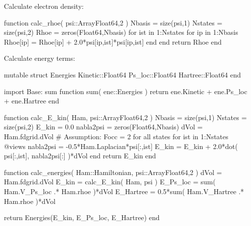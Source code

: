 Calculate electron density:
\begin{juliacode}
function calc_rhoe( psi::Array{Float64,2} )
    Nbasis = size(psi,1)
    Nstates = size(psi,2)
    Rhoe = zeros(Float64,Nbasis)
    for ist in 1:Nstates
        for ip in 1:Nbasis
            Rhoe[ip] = Rhoe[ip] + 2.0*psi[ip,ist]*psi[ip,ist]
        end
    end
    return Rhoe
end
\end{juliacode}

Calculate energy terms:
\begin{juliacode}
mutable struct Energies
    Kinetic::Float64
    Ps_loc::Float64
    Hartree::Float64
end

import Base: sum
function sum( ene::Energies )
    return ene.Kinetic + ene.Ps_loc + ene.Hartree
end

function calc_E_kin( Ham, psi::Array{Float64,2} )
    Nbasis = size(psi,1)
    Nstates = size(psi,2)
    E_kin = 0.0
    nabla2psi = zeros(Float64,Nbasis)
    dVol = Ham.fdgrid.dVol
    # Assumption: Focc = 2 for all states
    for ist in 1:Nstates
        @views nabla2psi = -0.5*Ham.Laplacian*psi[:,ist]
        E_kin = E_kin + 2.0*dot( psi[:,ist], nabla2psi[:] )*dVol
    end
    return E_kin
end

function calc_energies( Ham::Hamiltonian, psi::Array{Float64,2} )
    dVol = Ham.fdgrid.dVol
    E_kin = calc_E_kin( Ham, psi )
    E_Ps_loc = sum( Ham.V_Ps_loc .* Ham.rhoe )*dVol
    E_Hartree = 0.5*sum( Ham.V_Hartree .* Ham.rhoe )*dVol

    return Energies(E_kin, E_Ps_loc, E_Hartree)
end
\end{juliacode}

